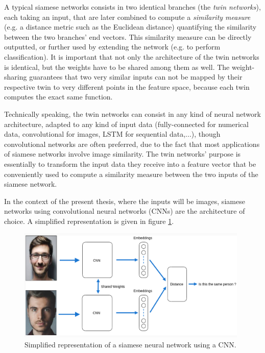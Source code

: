 \documentclass[11pt]{report}
\begin{document}
A typical siamese networks consists in two identical branches (the \emph{twin networks}), each taking an input, that are later combined to compute a \emph{similarity measure} (e.g. a distance metric such as the Euclidean distance) quantifying the similarity between the two branches' end vectors. This similarity measure can be directly outputted, or further used by extending the network (e.g. to perform classification).\newline
It is important that not only the architecture of the twin networks is identical, but the weights have to be shared among them as well. The weight-sharing guarantees that two very similar inputs can not be  mapped  by  their  respective  twin  to  very different points in the feature space, because each twin computes the exact same function.\newline

Technically speaking, the twin networks can consist in any kind of neural network architecture, adapted to any kind of input data (fully-connected for numerical data, convolutional for images, LSTM for sequential data,...), though convolutional networks are often preferred, due to the fact that most applications of siamese networks involve image similarity. The twin networks' purpose is essentially to transform the input data they receive into a feature vector that be conveniently used to compute a similarity measure between the two inputs of the siamese network.\newline 

In the context of the present thesis, where the inputs will be images, siamese networks using convolutional neural networks (CNNs) are the architecture of choice. A simplified representation is given in figure \ref{siam}.


\begin{figure}[H]
\centering\includegraphics[width=11cm]{siam.PNG}
\caption{Simplified representation of a siamese neural network using a CNN.}
\label{siam}
\end{figure}
\end{document}
